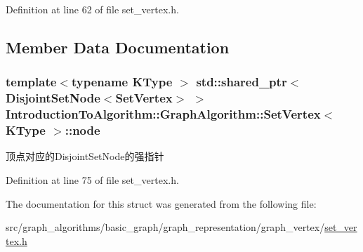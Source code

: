 Definition at line 62 of file set\+\_\+vertex.\+h.



\subsection{Member Data Documentation}
\hypertarget{struct_introduction_to_algorithm_1_1_graph_algorithm_1_1_set_vertex_aa01ac00440b97a31134559be597fe772}{}
\subsubsection[{node}]{\setlength{\rightskip}{0pt plus 5cm}template$<$typename K\+Type $>$ std\+::shared\+\_\+ptr$<${\bf Disjoint\+Set\+Node}$<${\bf Set\+Vertex}$>$ $>$ {\bf Introduction\+To\+Algorithm\+::\+Graph\+Algorithm\+::\+Set\+Vertex}$<$ K\+Type $>$\+::node}\label{struct_introduction_to_algorithm_1_1_graph_algorithm_1_1_set_vertex_aa01ac00440b97a31134559be597fe772}
顶点对应的\+Disjoint\+Set\+Node的强指针 

Definition at line 75 of file set\+\_\+vertex.\+h.



The documentation for this struct was generated from the following file\+:\begin{DoxyCompactItemize}
\item 
src/graph\+\_\+algorithms/basic\+\_\+graph/graph\+\_\+representation/graph\+\_\+vertex/\hyperlink{set__vertex_8h}{set\+\_\+vertex.\+h}\end{DoxyCompactItemize}

